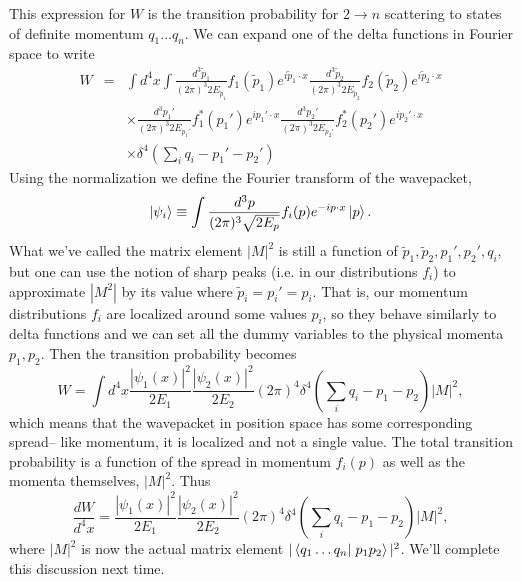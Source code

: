 This expression for $W$ is the transition probability for $2\to n$ scattering to states of definite momentum $q_1\ldots q_n$.
We can expand one of the delta functions in Fourier space to write 
\begin{eqnarray*}
W&=&\int d^4x \int \frac{d^3\tilde p_1}{(2\pi)^3 2E_{\tilde p_1}} f_1(\tilde p_1) e^{i\tilde p_1 \cdot x}\frac{d^3\tilde p_2}{(2\pi)^3 2E_{\tilde p_2}} f_2(\tilde p_2) e^{i\tilde p_2 \cdot x}\\
&&\times \frac{d^3 p_1'}{(2\pi)^3 2E_{p_1'}} f_1^*(p_1') e^{ip_1' \cdot x} \frac{d^3 p_2'}{(2\pi)^3 2E_{p_2'}} f_2^*(p_2') e^{ip_2' \cdot x}\\
&&\times\delta^4(\sum_i q_i - p_1'-p_2')
\end{eqnarray*}
Using the normalization we define the Fourier transform of the wavepacket,
$$\left| \psi_i \right>\equiv \int \frac{d^3p}{(2\pi)^3\sqrt{2E_p}}f_i(p) e^{-ip\cdot x}\left| p \right>.$$
What we've called the matrix element $|M|^2$ is still a function of $\tilde p_1, \tilde p_2,p_1', p_2', q_i$, but one can use the notion of sharp peaks (i.e. in our distributions $f_i$) to approximate $|M^2|$ by its value where $\tilde p_i=p_i' = p_i.$ That is, our momentum distributions $f_i$ are localized around some values $p_i$, so they behave similarly to delta functions and we can set all the dummy variables to the physical momenta $p_1,p_2$. Then the transition probability becomes
$$W=\int d^4x \frac{|\psi_1 (x)|^2}{2E_1}\frac{|\psi_2(x)|^2}{2E_2}(2\pi)^4 \delta^4(\sum_i q_i-p_1-p_2)|M|^2,$$
which means that the wavepacket in position space has some corresponding spread-- like momentum, it is localized and not a single value. The total transition probability is a function of the spread in momentum $f_i(p)$ as well as the momenta themselves, $|M|^2$. Thus
$$\frac{dW}{d^4x}=\frac{|\psi_1 (x)|^2}{2E_1}\frac{|\psi_2(x)|^2}{2E_2}(2\pi)^4 \delta^4(\sum_i q_i-p_1-p_2)|M|^2,$$
where $|M|^2$ is now the actual matrix element $|\braket{q_1\ldots q_n}{p_1p_2}|^2$. We'll complete this discussion next time.